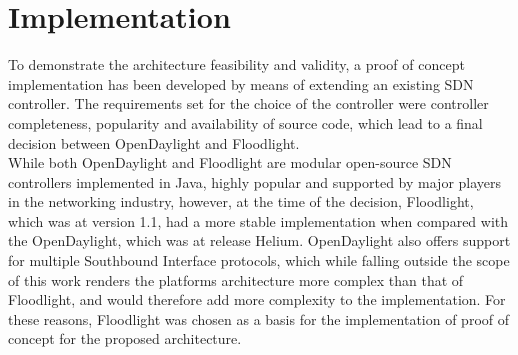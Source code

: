 
\chapter{Implementation}
\label{chapter:implementation}
To demonstrate the architecture feasibility and validity, a proof of concept implementation has been developed by means of extending an existing \gls{SDN} controller.
The requirements set for the choice of the controller were controller completeness, popularity and availability of source code, which lead to a final decision between OpenDaylight\cite{OpenDaylight} and Floodlight\cite{Floodlight}\cite{Kreutz2014}\cite{ControllerComparison}.\\
%
While both OpenDaylight and Floodlight are modular open-source \gls{SDN} controllers implemented in Java, highly popular and supported by major players in the networking industry\cite{OpenDaylight}\cite{Floodlight}, however, at the time of the decision, Floodlight, which was at version 1.1, had a more stable implementation when compared with the OpenDaylight, which was at release Helium.
OpenDaylight also offers support for multiple Southbound Interface protocols, which while falling outside the scope of this work renders the platforms architecture more complex than that of Floodlight, and would therefore add more complexity to the implementation.
For these reasons, Floodlight was chosen as a basis for the implementation of proof of concept for the proposed architecture.\\
%
